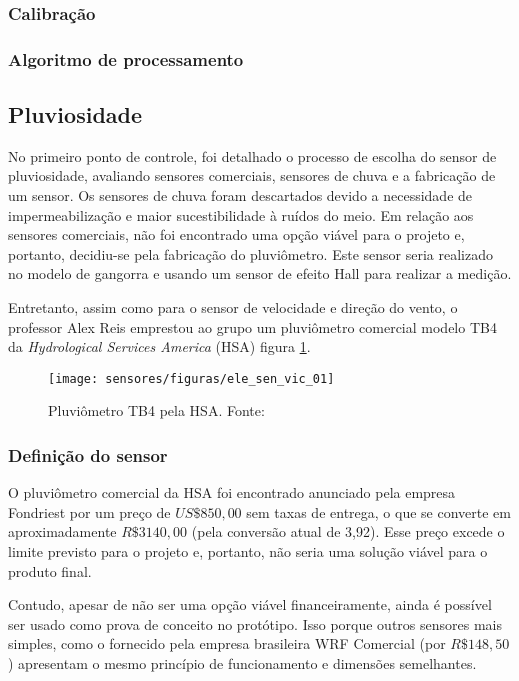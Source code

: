 		\subsubsection{Calibração}

		\subsubsection{Algoritmo de processamento}

	\subsection{Pluviosidade}

		No primeiro ponto de controle, foi detalhado o processo de escolha do sensor de pluviosidade, avaliando sensores comerciais, sensores de chuva e a fabricação de um sensor. Os sensores de chuva foram descartados devido a necessidade de impermeabilização e maior sucestibilidade à ruídos do meio. Em relação aos sensores comerciais, não foi encontrado uma opção viável para o projeto e, portanto, decidiu-se pela fabricação do pluviômetro. Este sensor seria realizado no modelo de gangorra e usando um sensor de efeito Hall para realizar a medição. 

		Entretanto, assim como para o sensor de velocidade e direção do vento, o professor Alex Reis emprestou ao grupo um pluviômetro comercial modelo TB4 da \emph{Hydrological Services America} (HSA) figura \ref{ele_sen_vic_01}.

		\begin{figure}[H]
			\centering
			\texttt{[image: sensores/figuras/ele\_sen\_vic\_01]}
			\caption{Pluviômetro TB4 pela HSA. Fonte: \cite{bib_sen_vic_01}}
			\label{ele_sen_vic_01}
		\end{figure}

		\subsubsection{Definição do sensor}

		O pluviômetro comercial da HSA foi encontrado anunciado pela empresa Fondriest por um preço de $US\$ 850,00$ sem taxas de entrega, o que se converte em aproximadamente $R\$ 3140,00$ (pela conversão atual de 3,92). Esse preço excede o limite previsto para o projeto e, portanto, não seria uma solução viável para o produto final. 

		Contudo, apesar de não ser uma opção viável financeiramente, ainda é possível ser usado como prova de conceito no protótipo. Isso porque outros sensores mais simples, como o fornecido pela empresa brasileira WRF Comercial (por $R\$ 148,50$) apresentam o mesmo princípio de funcionamento e dimensões semelhantes. 

